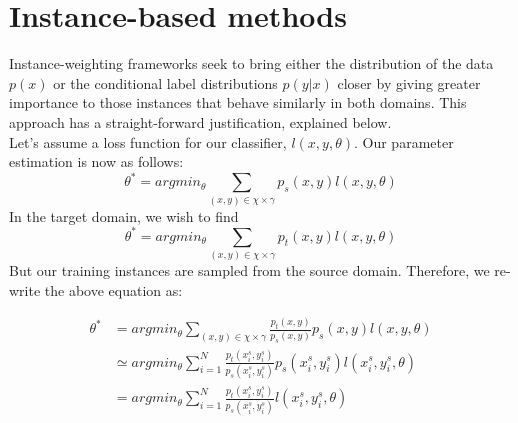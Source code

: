 \documentclass[12pt]{report}
\begin{document}
	\section{Instance-based methods}
	\label{instance}
	Instance-weighting frameworks seek to bring either the distribution of the data $p(x)$ or the conditional label distributions $p(y|x)$ closer by giving greater importance to those instances that behave similarly in both domains. This approach has a straight-forward justification, explained below.\\
	Let's assume a loss function for our classifier, $l(x,y,\theta)$. Our parameter estimation is now as follows:
	\[
		\theta^{*} = argmin_{\theta} \sum_{(x,y) \in \chi \times \gamma} p_{s}(x,y) l(x,y, \theta) 
	\]
	In the target domain, we wish to find
	\[
		\theta^{*} = argmin_{\theta} \sum_{(x,y) \in \chi \times \gamma} p_{t}(x,y) l(x,y, \theta)
	\]
	But our training instances are sampled from the source domain. Therefore, we re-write the above equation as:
	
	\begin{align*}
	\theta^{*} &= argmin_{\theta} \sum_{(x,y) \in \chi \times \gamma} \frac{p_{t}(x,y)}{p_{s}(x,y)} p_{s}(x,y)l(x,y, \theta) \\
	&\simeq argmin_{\theta} \sum_{i=1}^{N} \frac{p_{t}(x_{i}^{s},y_{i}^{s})}{p_{s}(x_{i}^{s},y_{i}^{s})} p_{s}(x_{i}^{s},y_{i}^{s})l(x_{i}^{s},y_{i}^{s}, \theta)\\
	&= argmin_{\theta} \sum_{i=1}^{N} \frac{p_{t}(x_{i}^{s},y_{i}^{s})}{p_{s}(x_{i}^{s},y_{i}^{s})} l(x_{i}^{s},y_{i}^{s}, \theta)
	\end{align*}
		
\end{document}
